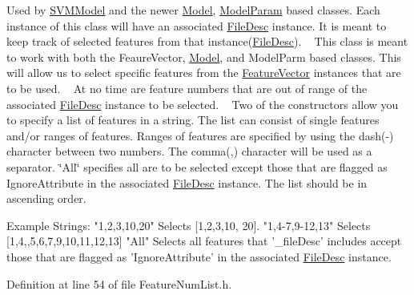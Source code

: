 Used by \hyperlink{class_k_k_m_l_l_1_1_s_v_m_model}{S\+V\+M\+Model} and the newer \textquotesingle{}\hyperlink{class_k_k_m_l_l_1_1_model}{Model}\textquotesingle{}, \textquotesingle{}\hyperlink{class_k_k_m_l_l_1_1_model_param}{Model\+Param}\textquotesingle{} based classes. Each instance of this class will have an associated \textquotesingle{}\hyperlink{class_k_k_m_l_l_1_1_file_desc}{File\+Desc}\textquotesingle{} instance. It is meant to keep track of selected features from that instance(\textquotesingle{}\hyperlink{class_k_k_m_l_l_1_1_file_desc}{File\+Desc}\textquotesingle{}). ~\newline
 This class is meant to work with both the Feaure\+Vector, \hyperlink{class_k_k_m_l_l_1_1_model}{Model}, and Model\+Parm based classes. This will allow us to select specific features from the \hyperlink{class_k_k_m_l_l_1_1_feature_vector}{Feature\+Vector} instances that are to be used. ~\newline
 At no time are feature numbers that are out of range of the associated \hyperlink{class_k_k_m_l_l_1_1_file_desc}{File\+Desc} instance to be selected. ~\newline
 Two of the constructors allow you to specify a list of features in a string. The list can consist of single features and/or ranges of features. Ranges of features are specified by using the dash(\textquotesingle{}-\/\textquotesingle{}) character between two numbers. The comma(\textquotesingle{},\textquotesingle{}) character will be used as a separator. \char`\"{}\+All\char`\"{} specifies all are to be selected except those that are flagged as \textquotesingle{}Ignore\+Attribute\textquotesingle{} in the associated \hyperlink{class_k_k_m_l_l_1_1_file_desc}{File\+Desc} instance. The list should be in ascending order.


\begin{DoxyCode}
Example Strings:
  \textcolor{stringliteral}{"1,2,3,10,20"}    Selects [1,2,3,10, 20].
  \textcolor{stringliteral}{"1,4-7,9-12,13"}  Selects [1,4,,5,6,7,9,10,11,12,13]
  \textcolor{stringliteral}{"All"}            Selects all features that \textcolor{stringliteral}{'\_fileDesc'} includes accept
                   those that are flagged as \textcolor{stringliteral}{'IgnoreAttribute'} in the 
                   associated \hyperlink{class_k_k_m_l_l_1_1_feature_num_list_a8c887df1129ad7d3119c33549373b478}{FileDesc} instance.
\end{DoxyCode}
 

Definition at line 54 of file Feature\+Num\+List.\+h.



